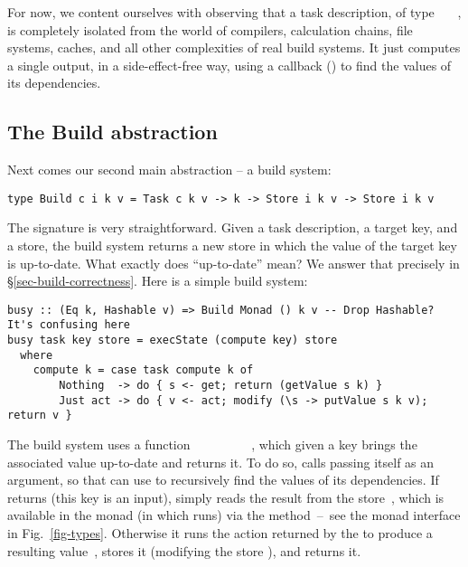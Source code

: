 For now, we content ourselves with observing that a task description,
of type ~~~, is completely isolated from the world of
compilers, calculation chains, file systems, caches, and all other
complexities of real build systems.  It just computes a single output, in
a side-effect-free way, using a callback () to find the values
of its dependencies.

\subsection{The Build abstraction}\label{sec-general-build}

Next comes our second main abstraction -- a build system:
\vspace{1mm}
\begin{verbatim}
type Build c i k v = Task c k v -> k -> Store i k v -> Store i k v
\end{verbatim}
\vspace{1mm}
The signature is very straightforward.  Given a task description, a target key,
and a store, the build system returns a new store in which the value of the
target key is up-to-date. What exactly does ``up-to-date'' mean?  We answer
that precisely in \S\ref{sec-build-correctness}. Here is a simple build system:

\vspace{1mm}
\begin{verbatim}
busy :: (Eq k, Hashable v) => Build Monad () k v -- Drop Hashable? It's confusing here
busy task key store = execState (compute key) store
  where
    compute k = case task compute k of
        Nothing  -> do { s <- get; return (getValue s k) }
        Just act -> do { v <- act; modify (\s -> putValue s k v); return v }
\end{verbatim}
\vspace{1mm}

\noindent
The  build system uses a function
~\hs{::}~~\hs{->}~~~~~~,
which given a key brings the associated value up-to-date and returns it. To do
so,  calls  passing itself as an argument, so that 
can use  to recursively find the values of its dependencies. If
 returns  (this key is an input),  simply reads
the result from the store~, which is available in the  monad (in
which  runs) via the  method~--~see the  monad
interface in Fig.~\ref{fig-types}. Otherwise it runs the action 
returned by the  to produce a resulting value~, stores it
(modifying the store ), and returns it.

